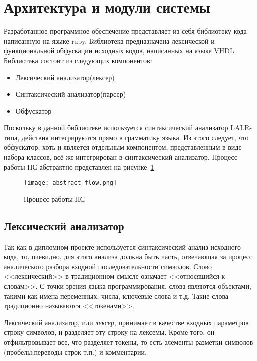 
\section{Архитектура и модули системы} %
\label{sec:arch_and_mod}

Разработанное программное обеспечение представляет из себя библиотеку кода написанную на языке ruby.
Библиотека предназначена лексической и функциональной обфускации исходных кодов, написанных на языке VHDL.
Библиотeка состоит из следующих компонентов:
\begin{itemize}
\item Лексический анализатор(лексер)
\item Синтаксический анализатор(парсер)
\item Обфускатор
\end{itemize}
Поскольку в данной библиотеке используется синтаксический анализатор LALR-типа, действия интегрируются прямо в грамматику языка. Из этого следует, что обфускатор, хоть и является отдельным компонентом, представленным в виде набора классов, всё же интегрирован в синтаксический анализатор. Процесс работы ПС абстрактно представлен на рисунке~\ref{fig:arch_and_mod::abstract_flow}
\begin{figure}[ht]
  \centering
  \texttt{[image: abstract\_flow.png]}
  \caption{ Процесс работы ПС }
  \label{fig:arch_and_mod::abstract_flow}
\end{figure}


\subsection{Лексический анализатор}
\label{sub:arch_and_mod:lexer}

Так как в дипломном проекте используется синтаксический анализ исходного кода, то, очевидно, для этого анализа должна быть часть, отвечающая за процесс аналического разбора входной последовательности символов. Слово <<лексический>> в традиционном смысле означает <<относящийся к словам>>. С точки зрения языка программирования, слова являются объектами, такими как имена переменных, числа, ключевые слова и т.д. Такие слова традиционно называются <<токенами>>\cite{basic_compiler_design}.

Лексический анализатор, или \textit{лексер}, принимает в качестве входных параметров строку символов, и разделяет эту строку на лексемы. Кроме того, он отфильтровывает все, что разделяет токены, то есть элементы разметки символов (пробелы,переводы строк т.п.) и комментарии.

